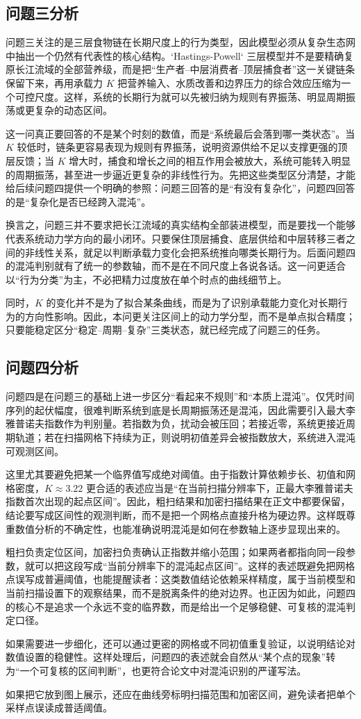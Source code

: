 \subsection{问题三分析}
问题三关注的是三层食物链在长期尺度上的行为类型，因此模型必须从复杂生态网中抽出一个仍然有代表性的核心结构。`Hastings-Powell` 三层模型并不是要精确复原长江流域的全部营养级，而是把“生产者--中层消费者--顶层捕食者”这一关键链条保留下来，再用承载力 \(K\) 把营养输入、水质改善和边界压力的综合效应压缩为一个可控尺度。这样，系统的长期行为就可以先被归纳为规则有界振荡、明显周期振荡或更复杂的动态区间。

这一问真正要回答的不是某个时刻的数值，而是“系统最后会落到哪一类状态”。当 \(K\) 较低时，链条更容易表现为规则有界振荡，说明资源供给不足以支撑更强的顶层反馈；当 \(K\) 增大时，捕食和增长之间的相互作用会被放大，系统可能转入明显的周期振荡，甚至进一步逼近更复杂的非线性行为。先把这些类型区分清楚，才能给后续问题四提供一个明确的参照：问题三回答的是“有没有复杂化”，问题四回答的是“复杂化是否已经跨入混沌”。

换言之，问题三并不要求把长江流域的真实结构全部装进模型，而是要找一个能够代表系统动力学方向的最小闭环。只要保住顶层捕食、底层供给和中层转移三者之间的非线性关系，就足以判断承载力变化会把系统推向哪类长期行为。后面问题四的混沌判别就有了统一的参数轴，而不是在不同尺度上各说各话。这一问更适合以“行为分类”为主，不必把精力过度放在单个时点的曲线细节上。

同时，\(K\) 的变化并不是为了拟合某条曲线，而是为了识别承载能力变化对长期行为的方向性影响。因此，本问更关注区间上的动力学分型，而不是单点拟合精度；只要能稳定区分“稳定--周期--复杂”三类状态，就已经完成了问题三的任务。

\subsection{问题四分析}
问题四是在问题三的基础上进一步区分“看起来不规则”和“本质上混沌”。仅凭时间序列的起伏幅度，很难判断系统到底是长周期振荡还是混沌，因此需要引入最大李雅普诺夫指数作为判别量。若指数为负，扰动会被压回；若接近零，系统更接近周期轨道；若在扫描网格下持续为正，则说明初值差异会被指数放大，系统进入混沌可观测区间。

这里尤其要避免把某一个临界值写成绝对阈值。由于指数计算依赖步长、初值和网格密度，\(K\approx 3.22\) 更合适的表述应当是“在当前扫描分辨率下，正最大李雅普诺夫指数首次出现的起点区间”。因此，粗扫结果和加密扫描结果在正文中都要保留，结论要写成区间性的观测判断，而不是把一个网格点直接升格为硬边界。这样既尊重数值分析的不确定性，也能准确说明混沌是如何在参数轴上逐步显现出来的。

粗扫负责定位区间，加密扫负责确认正指数并缩小范围；如果两者都指向同一段参数，就可以把这段写成“当前分辨率下的混沌起点区间”。这样的表述既避免把网格点误写成普遍阈值，也能提醒读者：这类数值结论依赖采样精度，属于当前模型和当前扫描设置下的观察结果，而不是脱离条件的绝对边界。也正因为如此，问题四的核心不是追求一个永远不变的临界数，而是给出一个足够稳健、可复核的混沌判定口径。

如果需要进一步细化，还可以通过更密的网格或不同初值重复验证，以说明结论对数值设置的稳健性。这样处理后，问题四的表述就会自然从“某个点的现象”转为“一个可复核的区间判断”，也更符合论文中对混沌识别的严谨写法。

如果把它放到图上展示，还应在曲线旁标明扫描范围和加密区间，避免读者把单个采样点误读成普适阈值。
